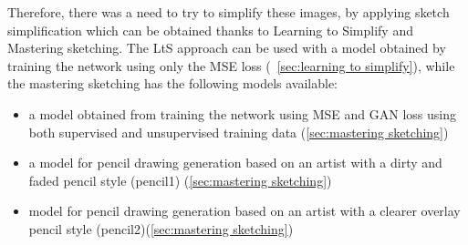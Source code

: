 \noindent Therefore, there was a need to try to simplify these images, by applying sketch simplification which can be obtained thanks to Learning to Simplify and Mastering sketching. The LtS approach can be used with a model obtained by training the network using only the MSE loss (~\ref{sec:learning to simplify}), while the mastering sketching has the following models available:
%
\begin{itemize} 
\setlength{\itemsep}{1pt}
\setlength{\parskip}{0pt}
\setlength{\parsep}{0pt}
    \item a model obtained from training the network using MSE and GAN loss using both supervised and unsupervised training data (\ref{sec:mastering sketching})
    \item a model for pencil drawing generation based on an artist with a dirty and faded pencil style (pencil1) (\ref{sec:mastering sketching})
    \item model for pencil drawing generation based on an artist with a clearer overlay pencil style (pencil2)(\ref{sec:mastering sketching})
\end{itemize}

